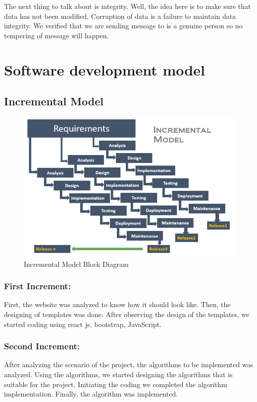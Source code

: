 The next thing to talk about is integrity. Well, the idea here is to make sure that data has not been modified. Corruption of data is a failure to maintain data integrity. We verified that we are sending message to is a genuine person so no tempering of message will happen.




\pagebreak
\section{Software development model}
\subsection{Incremental Model}
\begin{figure}[H]
	\centering
	\includegraphics[width=160mm]{images/incremental model.png}{}
	\caption{Incremental Model Block Diagram} %
	\label{figincremental} %
\end{figure}

\subsubsection{First Increment:}
First, the website was analyzed to know how it should look like.
Then, the designing of templates was done. After observing the design of the
templates, we started coding using react js, bootstrap, JavaScript.

\subsubsection{Second Increment:}
After analyzing the scenario of the project, the algorithms to be
implemented was analyzed. Using the algorithms, we started designing
the algorithms that is suitable for the project. Initiating the coding we
completed the algorithm implementation.
Finally, the algorithm was implemented.

